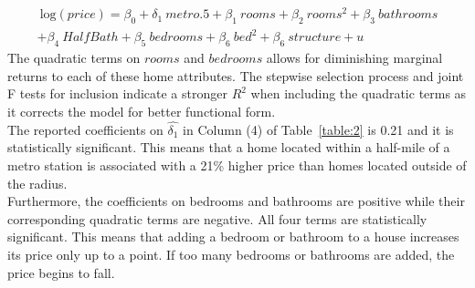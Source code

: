 \documentclass[12pt]{report}
\newcommand\tab[1][.50cm]{\hspace*{#1}}
\begin{document}
\begin{align}
\ \text{log}(price) = \beta_0 +\delta_1\ metro.5  + \beta_1 \ rooms + \beta_2\ rooms^2 + \beta_3\ bathrooms \nonumber \\ + \beta_4\ HalfBath + \beta_5\ bedrooms + \beta_6\ bed^2 + \beta_6\ structure + u \ 
\label{eqn:5}
\end{align}
The quadratic terms on $rooms$ and $bedrooms$ allows for diminishing marginal returns to each of these home attributes. The stepwise selection process and joint F tests for inclusion indicate a stronger $R^2$ when including the quadratic terms as it corrects the model for better functional form. \\
\tab The reported coefficients on $\hat{\delta_1}$  in Column (4) of Table~\ref{table:2} is 0.21 and it is statistically significant. This means that a home located within a half-mile of a metro station is associated with a 21\% higher price than homes located outside of the radius. \\
\tab Furthermore, the coefficients on bedrooms and bathrooms are positive while their corresponding quadratic terms are negative. All four terms are statistically significant. This means that adding a bedroom or bathroom to a house increases its price only up to a point. If too many bedrooms or bathrooms are added, the price begins to fall. 
\end{document}
